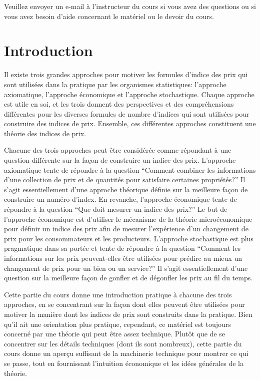 \documentclass[]{article}
\begin{document}
Veuillez envoyer un e-mail à l'instructeur du cours si vous avez des questions ou si vous avez besoin d'aide concernant le matériel ou le devoir du cours.

\hypertarget{introduction}{%
\section{Introduction}\label{introduction}}

Il existe trois grandes approches pour motiver les formules d'indice des prix qui sont utilisées dans la pratique par les organismes statistiques: l'approche axiomatique, l'approche économique et l'approche stochastique. Chaque approche est utile en soi, et les trois donnent des perspectives et des compréhensions différentes pour les diverses formules de nombre d'indices qui sont utilisées pour construire des indices de prix. Ensemble, ces différentes approches constituent une théorie des indices de prix.

Chacune des trois approches peut être considérée comme répondant à une question différente sur la façon de construire un indice des prix. L'approche axiomatique tente de répondre à la question ``Comment combiner les informations d'une collection de prix et de quantités pour satisfaire certaines propriétés?'' Il s'agit essentiellement d'une approche théorique définie sur la meilleure façon de construire un numéro d'index. En revanche, l'approche économique tente de répondre à la question ``Que doit mesurer un indice des prix?'' Le but de l'approche économique est d'utiliser le mécanisme de la théorie microéconomique pour définir un indice des prix afin de mesurer l'expérience d'un changement de prix pour les consommateurs et les producteurs. L'approche stochastique est plus pragmatique dans sa portée et tente de répondre à la question ``Comment les informations sur les prix peuvent-elles être utilisées pour prédire au mieux un changement de prix pour un bien ou un service?'' Il s'agit essentiellement d'une question sur la meilleure façon de gonfler et de dégonfler les prix au fil du temps.

Cette partie du cours donne une introduction pratique à chacune des trois approches, en se concentrant sur la façon dont elles peuvent être utilisées pour motiver la manière dont les indices de prix sont construits dans la pratique. Bien qu'il ait une orientation plus pratique, cependant, ce matériel est toujours concerné par une théorie qui peut être assez technique. Plutôt que de se concentrer sur les détails techniques (dont ils sont nombreux), cette partie du cours donne un aperçu suffisant de la machinerie technique pour montrer ce qui se passe, tout en fournissant l'intuition économique et les idées générales de la théorie.
\end{document}
